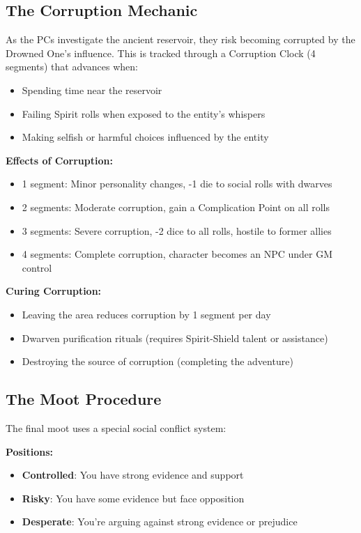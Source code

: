 \documentclass[11pt]{article}
\begin{document}
\subsection{The Corruption Mechanic}

As the PCs investigate the ancient reservoir, they risk becoming corrupted by the Drowned One's influence. This is tracked through a Corruption Clock (4 segments) that advances when:
\begin{itemize}
\item Spending time near the reservoir
\item Failing Spirit rolls when exposed to the entity's whispers
\item Making selfish or harmful choices influenced by the entity
\end{itemize}

\textbf{Effects of Corruption:}
\begin{itemize}
\item 1 segment: Minor personality changes, -1 die to social rolls with dwarves
\item 2 segments: Moderate corruption, gain a Complication Point on all rolls
\item 3 segments: Severe corruption, -2 dice to all rolls, hostile to former allies
\item 4 segments: Complete corruption, character becomes an NPC under GM control
\end{itemize}

\textbf{Curing Corruption:}
\begin{itemize}
\item Leaving the area reduces corruption by 1 segment per day
\item Dwarven purification rituals (requires Spirit-Shield talent or assistance)
\item Destroying the source of corruption (completing the adventure)
\end{itemize}

\subsection{The Moot Procedure}

The final moot uses a special social conflict system:

\textbf{Positions:}
\begin{itemize}
\item \textbf{Controlled}: You have strong evidence and support
\item \textbf{Risky}: You have some evidence but face opposition
\item \textbf{Desperate}: You're arguing against strong evidence or prejudice
\end{itemize}
\end{document}
